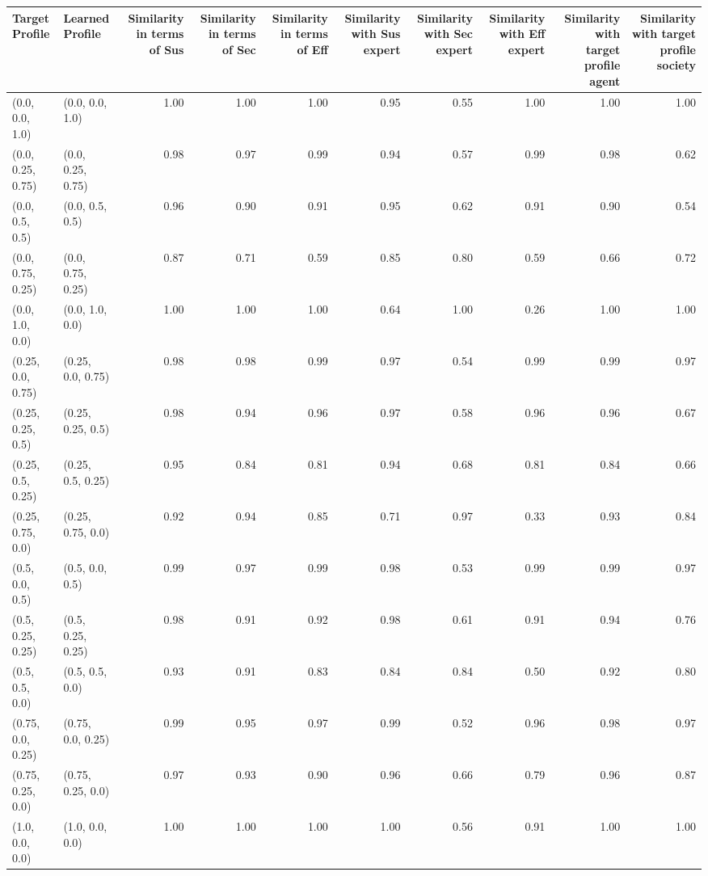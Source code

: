 \begin{tabular}{llrrrrrrrr}
\toprule
Target Profile & Learned Profile & Similarity in terms of Sus & Similarity in terms of Sec & Similarity in terms of Eff & Similarity with Sus expert & Similarity with Sec expert & Similarity with Eff expert & Similarity with target profile agent & Similarity with target profile society \\
\midrule
(0.0, 0.0, 1.0) & (0.0, 0.0, 1.0) & 1.00 & 1.00 & 1.00 & 0.95 & 0.55 & 1.00 & 1.00 & 1.00 \\
(0.0, 0.25, 0.75) & (0.0, 0.25, 0.75) & 0.98 & 0.97 & 0.99 & 0.94 & 0.57 & 0.99 & 0.98 & 0.62 \\
(0.0, 0.5, 0.5) & (0.0, 0.5, 0.5) & 0.96 & 0.90 & 0.91 & 0.95 & 0.62 & 0.91 & 0.90 & 0.54 \\
(0.0, 0.75, 0.25) & (0.0, 0.75, 0.25) & 0.87 & 0.71 & 0.59 & 0.85 & 0.80 & 0.59 & 0.66 & 0.72 \\
(0.0, 1.0, 0.0) & (0.0, 1.0, 0.0) & 1.00 & 1.00 & 1.00 & 0.64 & 1.00 & 0.26 & 1.00 & 1.00 \\
(0.25, 0.0, 0.75) & (0.25, 0.0, 0.75) & 0.98 & 0.98 & 0.99 & 0.97 & 0.54 & 0.99 & 0.99 & 0.97 \\
(0.25, 0.25, 0.5) & (0.25, 0.25, 0.5) & 0.98 & 0.94 & 0.96 & 0.97 & 0.58 & 0.96 & 0.96 & 0.67 \\
(0.25, 0.5, 0.25) & (0.25, 0.5, 0.25) & 0.95 & 0.84 & 0.81 & 0.94 & 0.68 & 0.81 & 0.84 & 0.66 \\
(0.25, 0.75, 0.0) & (0.25, 0.75, 0.0) & 0.92 & 0.94 & 0.85 & 0.71 & 0.97 & 0.33 & 0.93 & 0.84 \\
(0.5, 0.0, 0.5) & (0.5, 0.0, 0.5) & 0.99 & 0.97 & 0.99 & 0.98 & 0.53 & 0.99 & 0.99 & 0.97 \\
(0.5, 0.25, 0.25) & (0.5, 0.25, 0.25) & 0.98 & 0.91 & 0.92 & 0.98 & 0.61 & 0.91 & 0.94 & 0.76 \\
(0.5, 0.5, 0.0) & (0.5, 0.5, 0.0) & 0.93 & 0.91 & 0.83 & 0.84 & 0.84 & 0.50 & 0.92 & 0.80 \\
(0.75, 0.0, 0.25) & (0.75, 0.0, 0.25) & 0.99 & 0.95 & 0.97 & 0.99 & 0.52 & 0.96 & 0.98 & 0.97 \\
(0.75, 0.25, 0.0) & (0.75, 0.25, 0.0) & 0.97 & 0.93 & 0.90 & 0.96 & 0.66 & 0.79 & 0.96 & 0.87 \\
(1.0, 0.0, 0.0) & (1.0, 0.0, 0.0) & 1.00 & 1.00 & 1.00 & 1.00 & 0.56 & 0.91 & 1.00 & 1.00 \\
\bottomrule
\end{tabular}
